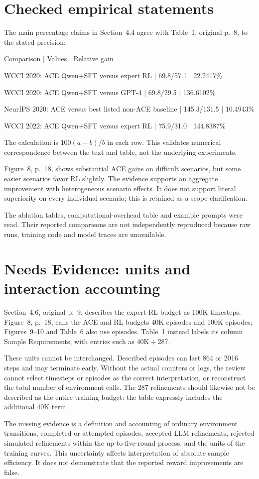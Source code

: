\documentclass[10pt]{article}
\begin{document}
\section*{Checked empirical statements}
The main percentage claims in Section 4.4 agree with Table 1, original p. 8, to the stated precision:\par
Comparison | Values | Relative gain\par
WCCI 2020: ACE Qwen+SFT versus expert RL | 69.8/57.1 | 22.2417\%\par
WCCI 2020: ACE Qwen+SFT versus GPT-4 | 69.8/29.5 | 136.6102\%\par
NeurIPS 2020: ACE versus best listed non-ACE baseline | 145.3/131.5 | 10.4943\%\par
WCCI 2022: ACE Qwen+SFT versus expert RL | 75.9/31.0 | 144.8387\%\par
The calculation is \(100(a-b)/b\) in each row. This validates numerical correspondence between the text and table, not the underlying experiments.\par
Figure 8, p. 18, shows substantial ACE gains on difficult scenarios, but some easier scenarios favor RL slightly. The evidence supports an aggregate improvement with heterogeneous scenario effects. It does not support literal superiority on every individual scenario; this is retained as a scope clarification.\par
The ablation tables, computational-overhead table and example prompts were read. Their reported comparisons are not independently reproduced because raw runs, training code and model traces are unavailable.\par
\section*{Needs Evidence: units and interaction accounting}
Section 4.6, original p. 9, describes the expert-RL budget as 100K timesteps. Figure 8, p. 18, calls the ACE and RL budgets 40K episodes and 100K episodes; Figures 9–10 and Table 6 also use episodes. Table 1 instead labels its column Sample Requirements, with entries such as \(40\mathrm K+287\).\par
These units cannot be interchanged. Described episodes can last 864 or 2016 steps and may terminate early. Without the actual counters or logs, the review cannot select timesteps or episodes as the correct interpretation, or reconstruct the total number of environment calls. The 287 refinements should likewise not be described as the entire training budget: the table expressly includes the additional \(40\mathrm K\) term.\par
The missing evidence is a definition and accounting of ordinary environment transitions, completed or attempted episodes, accepted LLM refinements, rejected simulated refinements within the up-to-five-round process, and the units of the training curves. This uncertainty affects interpretation of absolute sample efficiency. It does not demonstrate that the reported reward improvements are false.\par
\end{document}
